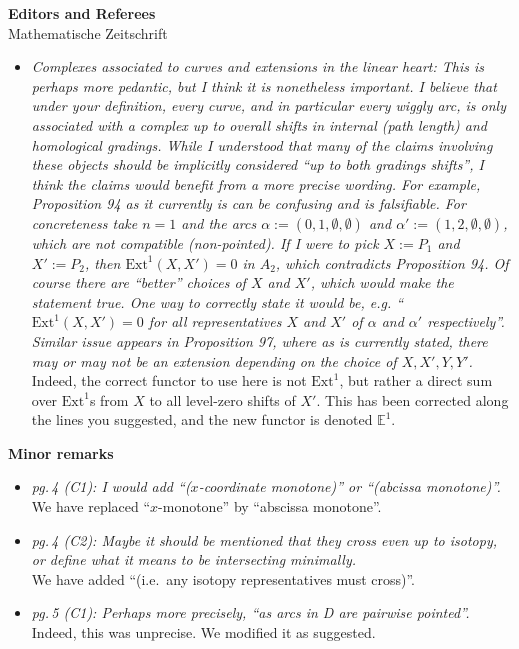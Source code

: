 \documentclass{letter}
\begin{document}
\begin{letter}{{\bf Editors and Referees} \\ Mathematische Zeitschrift}
\begin{itemize}
\item \textsl{\color{gray} Complexes associated to curves and extensions in the linear heart: This is perhaps more pedantic, but I think it is nonetheless important. I believe that under your definition, every curve, and in particular every wiggly arc, is only associated with a complex up to overall shifts in internal (path length) and homological gradings. While I understood that many of the claims involving these objects should be implicitly considered “up to both gradings shifts”, I think the claims would benefit from a more precise wording. For example, Proposition 94 as it currently is can be confusing and is falsifiable. For concreteness take $n = 1$ and the arcs $\alpha := (0, 1, \emptyset, \emptyset)$ and $\alpha' := (1, 2, \emptyset, \emptyset)$, which are not compatible (non-pointed). If I were to pick $X := P_1$ and $X' := P_2$, then $\mathrm{Ext}^1(X, X') = 0$ in $A_2$, which contradicts Proposition 94. Of course there are ``better'' choices of $X$ and $X'$, which would make the statement true. One way to correctly state it would be, e.g. ``$\mathrm{Ext}^1(X,X') = 0$ for all representatives $X$ and $X'$ of $\alpha$ and $\alpha'$ respectively''. Similar issue appears in Proposition 97, where as is currently stated, there may or may not be an extension depending on the choice of $X, X', Y, Y'$.} \\
  Indeed, the correct functor to use here is not \(\mathrm{Ext}^1\), but rather a direct sum over \(\mathrm{Ext}^1\)s from \(X\) to all level-zero shifts of \(X'\).
  This has been corrected along the lines you suggested, and the new functor is denoted \(\mathbb{E}^1\).

\end{itemize}

{\bf Minor remarks}

\begin{itemize}
\item \textsl{\color{gray} pg.\,4 (C1): I would add ``($x$-coordinate monotone)'' or ``(abcissa monotone)''.} \\
We have replaced ``$x$-monotone'' by ``abscissa monotone''.

\item \textsl{\color{gray} pg.\,4 (C2): Maybe it should be mentioned that they cross even up to isotopy, or define what it means to be intersecting minimally.} \\
We have added ``(i.e.~any isotopy representatives must cross)''.

\item \textsl{\color{gray} pg.\,5 (C1): Perhaps more precisely, ``as arcs in D are pairwise pointed''.} \\
Indeed, this was unprecise. We modified it as suggested.


\end{itemize}
\end{letter}
\end{document}
